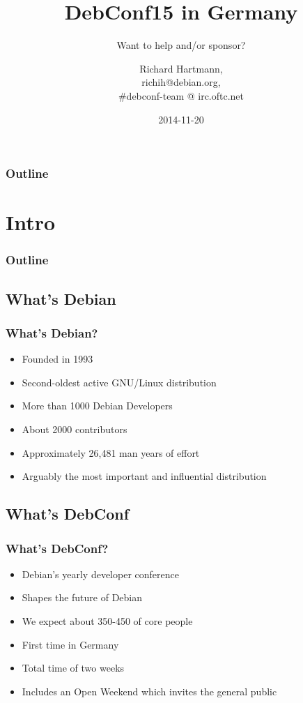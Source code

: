 \documentclass[t]{beamer}
\title{DebConf15 in Germany}
\subtitle{Want to help and/or sponsor?}
\author{Richard Hartmann,\\
	richih@debian.org,\\
	\#debconf-team @ irc.oftc.net
}
\date{2014-11-20}
\begin{document}
\setcounter{tocdepth}{1}

\begin{frame}
	\titlepage
\end{frame}

\begin{frame}
	\frametitle{Outline}
	\tableofcontents
\end{frame}

\section{Intro}

\begin{frame}
	\frametitle{Outline}
	\tableofcontents[currentsection]
\end{frame}

\subsection{What's Debian}

\begin{frame}
	\frametitle{What's Debian?}
	\vfill
	\begin{itemize}
		\item Founded in 1993
		\item Second-oldest active GNU/Linux distribution
		\item More than 1000 Debian Developers
		\item About 2000 contributors
		\item Approximately 26,481 man years of effort
		\item Arguably the most important and influential distribution
	\end{itemize}
	\vfill
\end{frame}

\subsection{What's DebConf}

\begin{frame}
	\frametitle{What's DebConf?}
	\vfill
	\begin{itemize}
		\item Debian's yearly developer conference
		\item Shapes the future of Debian
		\item We expect about 350-450 of core people
		\item First time in Germany
		\item Total time of two weeks
			\item Includes an Open Weekend which invites the general public
	\end{itemize}
	\vfill
\end{frame}
\end{document}
